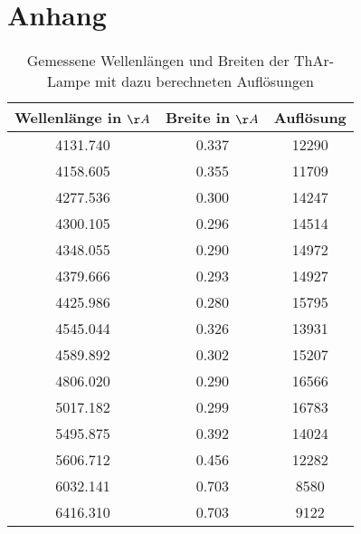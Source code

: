 \section{Anhang}
\begin{table}[htbp]
\begin{center}
\begin{tabular}{c|c|c}

Wellenlänge in $\AA$ & Breite in $\AA$ & Auflösung \\ 
\hline
4131.740 & 0.337 & 12290 \\ 
4158.605 & 0.355 & 11709 \\ 
4277.536 & 0.300 & 14247 \\ 
4300.105 & 0.296 & 14514 \\ 
4348.055 & 0.290 & 14972 \\ 
4379.666 & 0.293 & 14927 \\ 
4425.986 & 0.280 & 15795 \\ 
4545.044 & 0.326 & 13931 \\ 
4589.892 & 0.302 & 15207 \\ 
4806.020 & 0.290 & 16566 \\ 
5017.182 & 0.299 & 16783 \\ 
5495.875 & 0.392 & 14024 \\ 
5606.712 & 0.456 & 12282 \\ 
6032.141 & 0.703 & 8580 \\ 
6416.310 & 0.703 & 9122 \\ 
\end{tabular}
\end{center}
\caption{Gemessene Wellenlängen und Breiten der ThAr-Lampe mit dazu berechneten Auflösungen}
\label{tab:Aufloesung}
\end{table}

